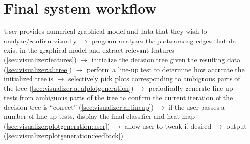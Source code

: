 \section{Final system workflow}
\label{sec:visualizer:summary}

User provides numerical graphical model and data that they wish to analyze/confirm visually $\rightarrow$ program analyzes the plots among edges that do exist in the graphical model and extract relevant features (\ref{sec:visualizer:features}) $\rightarrow$ initialize the decision tree given the resulting data (\ref{sec:visualizer:al:tree}) $\rightarrow$ perform a line-up test to determine how accurate the initialized tree is $\rightarrow$  selectively pick plots corresponding to ambiguous parts of the tree (\ref{sec:visualizer:al:alplotgeneration}) $\rightarrow$ periodically generate line-up tests from ambiguous parts of the tree to confirm the current iteration of the decision tree is ``correct'' (\ref{sec:visualizer:al:lineup}) $\rightarrow$  if the user passes a number of line-up tests, display the final classifier and heat map (\ref{sec:visualizer:plotgeneration:user}) $\rightarrow$ allow user to tweak if desired $\rightarrow$ output (\ref{sec:visualizer:plotgeneration:feedback})